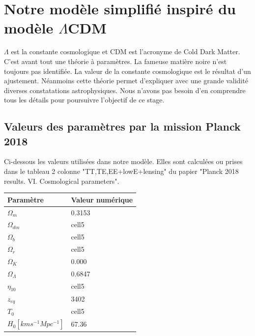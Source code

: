 \documentclass[10pt, a4paper]{report}
\numberwithin{equation}{subsection}
\begin{document}
\chapter{Notre modèle simplifié inspiré du modèle $\Lambda$CDM}
$\Lambda$ est la constante cosmologique et CDM est l'acronyme de Cold Dark Matter. C'est avant tout une théorie à paramètres. La fameuse matière noire n'est toujours pas identifiée. La valeur de la constante cosmologique est le résultat d'un ajustement. Néanmoins cette théorie permet d'expliquer avec une grande validité diverses constatations astrophysiques. Nous n'avons pas besoin d'en comprendre tous les détails pour poursuivre l'objectif de ce stage.

\section{Valeurs des paramètres par la mission Planck 2018}
Ci-dessous les valeurs utilisées dans notre modèle. Elles sont calculées ou prises dans le tableau 2 colonne "TT,TE,EE+lowE+lensing" du papier "Planck 2018 results. VI. Cosmological parameters".

\begin{center}
\begin{tabular}{ m{5cm} m{5cm} } 
 \hline
 Paramètre & Valeur numérique\\ 
 \hline
$\Omega_m$ & 0.3153\\ 
$\Omega_{dm}$ & cell5\\ 
$\Omega_b$ & cell5\\ 
$\Omega_r$ & cell5\\
$\Omega_K$ & 0.000\\
$\Omega_\Lambda$ & 0.6847\\ 
$\eta_{10}$ & cell5\\ 
$z_{eq}$ & 3402\\
$T_0$ & cell5\\ 
$H_0 [km s^{-1} Mpc^{-1}]$ & 67.36\\ 
 \hline
\end{tabular}
\end{center}
\end{document}

